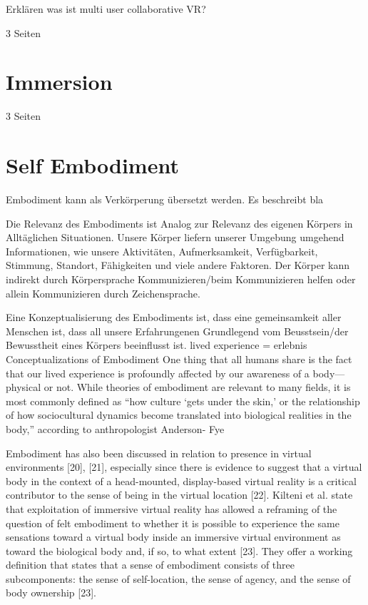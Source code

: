 Erklären was ist multi user collaborative VR?

3 Seiten
\section{Immersion}

\cite{Boas2012}

\cite{Tham2018}

3 Seiten


\section{Self Embodiment}
Embodiment kann als Verkörperung übersetzt werden. Es beschreibt bla

Die Relevanz des Embodiments ist Analog zur Relevanz des eigenen Körpers in Alltäglichen Situationen. Unsere Körper liefern unserer Umgebung umgehend Informationen, wie unsere Aktivitäten, Aufmerksamkeit, Verfügbarkeit, Stimmung, Standort, Fähigkeiten und viele andere Faktoren. Der Körper kann indirekt durch Körpersprache Kommunizieren/beim Kommunizieren helfen oder allein Kommunizieren durch Zeichensprache.\cite{Benford2010}

Eine Konzeptualisierung des Embodiments ist, dass eine gemeinsamkeit aller Menschen ist, dass all unsere Erfahrungenen Grundlegend vom Beusstsein/der Bewusstheit eines Körpers beeinflusst ist.
lived experience = erlebnis
Conceptualizations of Embodiment One thing that all humans share is the fact that our lived experience is profoundly affected by our awareness of a body—physical or not. While theories of embodiment are relevant to many fields, it is most commonly defined as “how culture ‘gets under the skin,’ or the relationship of how sociocultural dynamics become translated into biological realities in the body,” according to anthropologist Anderson- Fye

Embodiment has also been discussed in relation to presence in virtual environments [20], [21], especially since there is evidence to suggest that a virtual body in the context of a head-mounted, display-based virtual reality is a critical contributor to the sense of being in the virtual location [22]. Kilteni et al. state that exploitation of immersive virtual reality has allowed a reframing of the question of felt embodiment to whether it is possible to experience the same sensations toward a virtual body inside an immersive virtual environment as toward the biological body and, if so, to what extent [23]. They offer a working definition that states that a sense of embodiment consists of three subcomponents: the sense of self-location, the sense of agency, and the sense of body ownership [23].


